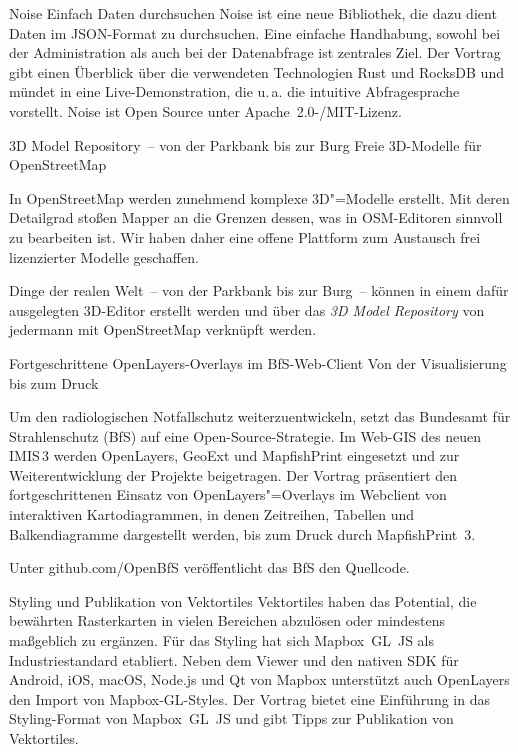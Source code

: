 %
{Noise}%
{Einfach Daten durchsuchen}%
{%
  Noise ist eine neue Bibliothek, die dazu dient Daten im JSON-Format zu durchsuchen. Eine einfache
  Handhabung, sowohl bei der Administration als auch bei der Datenabfrage ist zentrales Ziel. Der
  Vortrag gibt einen Überblick über die verwendeten Technologien Rust und RocksDB und mündet in eine
  Live-Demonstration, die u.\,a. die intuitive Abfragesprache vorstellt. Noise ist Open Source unter
  Apache~2.0-/MIT-Lizenz.%
}

%
{3D Model Repository~-- von der \mbox{Parkbank} bis zur Burg}%
{Freie 3D-Modelle für OpenStreetMap}%
{%
In OpenStreetMap werden zunehmend komplexe 3D"=Modelle erstellt. Mit deren Detailgrad stoßen Mapper
an die Grenzen dessen, was in OSM-Editoren sinnvoll zu bearbeiten ist. Wir haben daher eine offene
Plattform zum Austausch frei lizenzierter Modelle geschaffen.

Dinge der realen Welt~-- von der Parkbank bis zur Burg~-- können in einem dafür ausgelegten
3D-Editor erstellt werden und über das \emph{3D Model Repository} von jedermann mit OpenStreetMap
verknüpft werden.%
}



%
{Fortgeschrittene OpenLayers-Overlays im BfS-Web-Client\vspace{0.2em}}%
{Von der Visualisierung bis zum Druck}%
{%
Um den radiologischen Notfallschutz weiterzuentwickeln, setzt das Bundesamt für Strahlenschutz (BfS)
auf eine Open-Source-Strategie. Im Web-GIS des neuen IMIS\,3 werden OpenLayers, GeoExt und
MapfishPrint eingesetzt und zur Weiterentwicklung der Projekte beigetragen. Der Vortrag präsentiert
den fortgeschrittenen Einsatz von OpenLayers"=Overlays im Webclient von interaktiven
Kartodiagrammen, in denen Zeitreihen, Tabellen und Balkendiagramme dargestellt werden, bis zum Druck
durch MapfishPrint~3.

Unter github.com/OpenBfS veröffentlicht das BfS den Quellcode.
}

%
{Styling und Publikation von \mbox{Vektortiles}}%
{}%
{%
Vektortiles haben das Potential, die bewährten Rasterkarten in vielen Bereichen abzulösen oder
mindestens maßgeblich zu ergänzen. Für das Styling hat sich Mapbox~GL~JS als Industriestandard
etabliert. Neben dem Viewer und den nativen SDK für Android, iOS, macOS, Node.js und Qt von Mapbox
unterstützt auch OpenLayers den Import von Mapbox-GL-Styles.  Der Vortrag bietet eine Einführung
in das Styling-Format von Mapbox~GL~JS und gibt Tipps zur Publikation von Vektortiles.%
}

